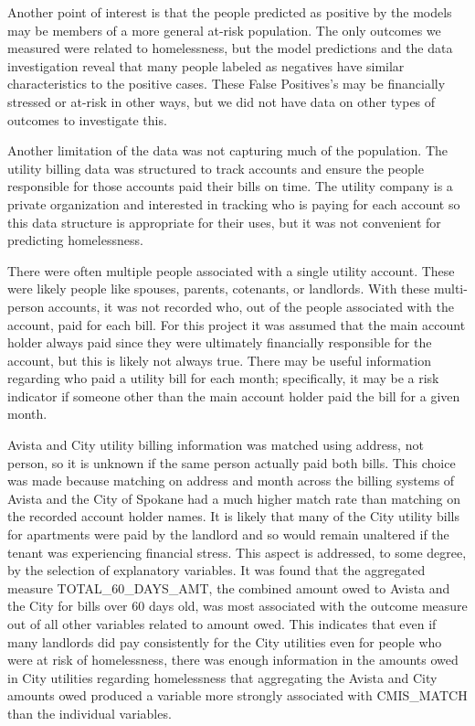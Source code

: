 \documentclass[10pt,letterpaper]{article}
\newcommand{\red}[1]{{\color{red}{#1}}}
\begin{document}
Another point of interest is that the people predicted as positive by the models may be members of a more general at-risk population. The only outcomes we measured were related to homelessness, but the model predictions and the data investigation reveal that many people labeled as negatives have similar characteristics to the positive cases. These False Positives's may be financially stressed or at-risk in other ways, but we did not have data on other types of outcomes to investigate this. \red{add info about Bryne's study - high prediction associated with drug addiction}

Another limitation of the data was not capturing much of the population. The utility billing data was structured to track accounts and ensure the people responsible for those accounts paid their bills on time. The utility company is a private organization and interested in tracking who is paying for each account so this data structure is appropriate for their uses, but it was not convenient for predicting homelessness.

There were often multiple people associated with a single utility account. These were likely people like spouses, parents, cotenants, or landlords. With these multi-person accounts, it was not recorded who, out of the people associated with the account, paid for each bill. For this project it was assumed that the main account holder always paid since they were ultimately financially responsible for the account, but this is likely not always true. There may be useful information regarding who paid a utility bill for each month; specifically, it may be a risk indicator if someone other than the main account holder paid the bill for a given month.

Avista and City utility billing information was matched using address, not person, so it is unknown if the same person actually paid both bills. This choice was made because matching on address and month across the billing systems of Avista and the City of Spokane had a much higher match rate than matching on the recorded account holder names. It is likely that many of the City utility bills for apartments were paid by the landlord and so would remain unaltered if the tenant was experiencing financial stress. This aspect is addressed, to some degree, by the selection of explanatory variables. It was found that the aggregated measure TOTAL\_60\_DAYS\_AMT, the combined amount owed to Avista and the City for bills over 60 days old, was most associated with the outcome measure out of all other variables related to amount owed. This indicates that even if many landlords did pay consistently for the City utilities even for people who were at risk of homelessness, there was enough information in the amounts owed in City utilities regarding homelessness that aggregating the Avista and City amounts owed produced a variable more strongly associated with CMIS\_MATCH than the individual variables.
\end{document}
